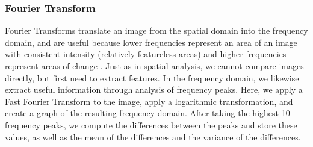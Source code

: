 
\subsubsection{Fourier Transform}

Fourier Transforms translate an image from the spatial domain into the frequency domain, and are useful because lower frequencies represent an area of an image with consistent intensity (relatively featureless areas) and higher frequencies represent areas of change \cite{Haas_2011,O'Higgins_1997}. Just as in spatial analysis, we cannot compare images directly, but first need to extract features. In the frequency domain, we likewise extract useful information through analysis of frequency peaks. Here, we apply a Fast Fourier Transform to the image, apply a logarithmic transformation, and create a graph of the resulting frequency domain. After taking the highest 10 frequency peaks, we compute the differences between the peaks and store these values, as well as the mean of the differences and the variance of the differences. 

    
  
  
  
  